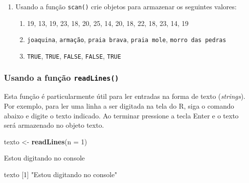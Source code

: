 \documentclass[10pt,a4paper]{book}
\newenvironment{Shaded}{\begin{snugshade}}{\end{snugshade}}
\newcommand{\KeywordTok}[1]{\textcolor[rgb]{0.13,0.29,0.53}{\textbf{#1}}}
\newcommand{\DataTypeTok}[1]{\textcolor[rgb]{0.13,0.29,0.53}{#1}}
\newcommand{\DecValTok}[1]{\textcolor[rgb]{0.00,0.00,0.81}{#1}}
\newcommand{\StringTok}[1]{\textcolor[rgb]{0.31,0.60,0.02}{#1}}
\newcommand{\NormalTok}[1]{#1}
\providecommand{\tightlist}{%
  \setlength{\itemsep}{0pt}\setlength{\parskip}{0pt}}
\begin{document}
\begin{enumerate}
\def\labelenumi{\arabic{enumi}.}
\tightlist
\item
  Usando a função \texttt{scan()} crie objetos para armazenar os
  seguintes valores:

  \begin{enumerate}
  \def\labelenumii{\alph{enumii}.}
  \tightlist
  \item
    19, 13, 19, 23, 18, 20, 25, 14, 20, 18, 22, 18, 23, 14, 19
  \item
    \texttt{joaquina}, \texttt{armação}, \texttt{praia\ brava},
    \texttt{praia\ mole}, \texttt{morro\ das\ pedras}
  \item
    \texttt{TRUE}, \texttt{TRUE}, \texttt{FALSE}, \texttt{FALSE},
    \texttt{TRUE}
  \end{enumerate}
\end{enumerate}

\subsubsection{\texorpdfstring{Usando a função
\texttt{readLines()}}{Usando a função readLines()}}\label{usando-a-funuxe7uxe3o-readlines}

Esta função é particularmente útil para ler entradas na forma de texto
(\emph{strings}). Por exemplo, para ler uma linha a ser digitada na tela
do R, siga o comando abaixo e digite o texto indicado. Ao terminar
pressione a tecla Enter e o texto será armazenado no objeto texto.

\begin{Shaded}
\begin{Highlighting}[]
\NormalTok{texto <-}\StringTok{ }\KeywordTok{readLines}\NormalTok{(}\DataTypeTok{n =} \DecValTok{1}\NormalTok{)}
\end{Highlighting}
\end{Shaded}

\begin{Shaded}
\begin{Highlighting}[]
\NormalTok{Estou digitando no console}
\end{Highlighting}
\end{Shaded}

\begin{Shaded}
\begin{Highlighting}[]
\NormalTok{texto}
\NormalTok{[}\DecValTok{1}\NormalTok{] }\StringTok{"Estou digitando no console"}
\end{Highlighting}
\end{Shaded}
\end{document}
